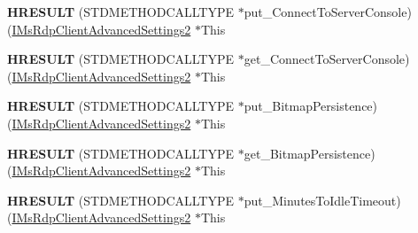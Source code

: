 \begin{DoxyCompactItemize}
\item 
\mbox{\label{struct_m_s_t_s_c_lib_1_1_i_ms_rdp_client_advanced_settings2_vtbl_ad6e9445c08c221fc88de2db7ed3b76b5}} 
{\bfseries H\+R\+E\+S\+U\+LT} (S\+T\+D\+M\+E\+T\+H\+O\+D\+C\+A\+L\+L\+T\+Y\+PE $\ast$put\+\_\+\+Connect\+To\+Server\+Console)(\hyperlink{interface_m_s_t_s_c_lib_1_1_i_ms_rdp_client_advanced_settings2}{I\+Ms\+Rdp\+Client\+Advanced\+Settings2} $\ast$This
\item 
\mbox{\label{struct_m_s_t_s_c_lib_1_1_i_ms_rdp_client_advanced_settings2_vtbl_ab6cf1be23eb044f9a6569f7d0d9d5dd2}} 
{\bfseries H\+R\+E\+S\+U\+LT} (S\+T\+D\+M\+E\+T\+H\+O\+D\+C\+A\+L\+L\+T\+Y\+PE $\ast$get\+\_\+\+Connect\+To\+Server\+Console)(\hyperlink{interface_m_s_t_s_c_lib_1_1_i_ms_rdp_client_advanced_settings2}{I\+Ms\+Rdp\+Client\+Advanced\+Settings2} $\ast$This
\item 
\mbox{\label{struct_m_s_t_s_c_lib_1_1_i_ms_rdp_client_advanced_settings2_vtbl_af9c3f6686c8510df92fdb6e6f03c1cbd}} 
{\bfseries H\+R\+E\+S\+U\+LT} (S\+T\+D\+M\+E\+T\+H\+O\+D\+C\+A\+L\+L\+T\+Y\+PE $\ast$put\+\_\+\+Bitmap\+Persistence)(\hyperlink{interface_m_s_t_s_c_lib_1_1_i_ms_rdp_client_advanced_settings2}{I\+Ms\+Rdp\+Client\+Advanced\+Settings2} $\ast$This
\item 
\mbox{\label{struct_m_s_t_s_c_lib_1_1_i_ms_rdp_client_advanced_settings2_vtbl_a05f95766580677518e621194f943db59}} 
{\bfseries H\+R\+E\+S\+U\+LT} (S\+T\+D\+M\+E\+T\+H\+O\+D\+C\+A\+L\+L\+T\+Y\+PE $\ast$get\+\_\+\+Bitmap\+Persistence)(\hyperlink{interface_m_s_t_s_c_lib_1_1_i_ms_rdp_client_advanced_settings2}{I\+Ms\+Rdp\+Client\+Advanced\+Settings2} $\ast$This
\item 
\mbox{\label{struct_m_s_t_s_c_lib_1_1_i_ms_rdp_client_advanced_settings2_vtbl_afcc107c3ce0bb3c732e04ffcda565547}} 
{\bfseries H\+R\+E\+S\+U\+LT} (S\+T\+D\+M\+E\+T\+H\+O\+D\+C\+A\+L\+L\+T\+Y\+PE $\ast$put\+\_\+\+Minutes\+To\+Idle\+Timeout)(\hyperlink{interface_m_s_t_s_c_lib_1_1_i_ms_rdp_client_advanced_settings2}{I\+Ms\+Rdp\+Client\+Advanced\+Settings2} $\ast$This

\end{DoxyCompactItemize}
